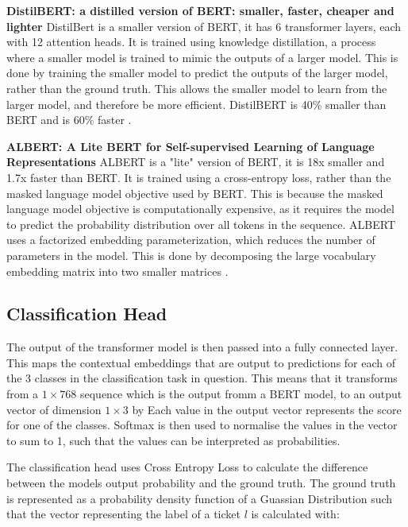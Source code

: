 \documentclass{UoYCSproject}
\begin{document}
    \textbf{DistilBERT: a distilled version of BERT: smaller, faster, cheaper and lighter}
    DistilBert is a smaller version of BERT, it has 6 transformer layers, each with 12 attention heads.
    It is trained using knowledge distillation, a process where a smaller model is trained to mimic the outputs of a larger model.
    This is done by training the smaller model to predict the outputs of the larger model, rather than the ground truth.
    This allows the smaller model to learn from the larger model, and therefore be more efficient.
    DistilBERT is 40\% smaller than BERT and is 60\% faster \cite{sanh2020distilbert}.
    \par

    \textbf{ALBERT: A Lite BERT for Self-supervised Learning of Language Representations}
    ALBERT is a "lite" version of BERT, it is 18x smaller and 1.7x faster than BERT.
    It is trained using a cross-entropy loss, rather than the masked language model objective used by BERT.
    This is because the masked language model objective is computationally expensive, as it requires the model to predict the probability distribution over all tokens in the sequence.
    ALBERT uses a factorized embedding parameterization, which reduces the number of parameters in the model.
    This is done by decomposing the large vocabulary embedding matrix into two smaller matrices \cite{sanh2020distilbert}.
    \par

    \subsection[classification-head]{Classification Head}
    The output of the transformer model is then passed into a fully connected layer.
    This maps the contextual embeddings that are output to predictions for each of the 3 classes in the classification task in question.
    This means that it transforms from a $1\times768$ sequence which is the output fromm a BERT model, to an output vector of dimension $1\times3$ by
    Each value in the output vector represents the score for one of the classes.
    Softmax is then used to normalise the values in the vector to sum to 1, such that the values can be interpreted as probabilities.

    The classification head uses Cross Entropy Loss to calculate the difference between the models output probability and the ground truth.
    The ground truth is represented as a probability density function of a Guassian Distribution such that the vector representing the label of a ticket $l$ is calculated with:
\end{document}
